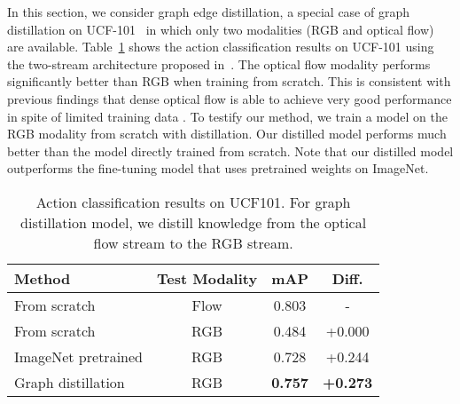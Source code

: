 In this section, we consider graph edge distillation, a special case of graph distillation on UCF-101~\cite{soomro2012ucf101} in which only two modalities (RGB and optical flow) are available. Table~\ref{ucf101} shows the action classification results on UCF-101 using the two-stream architecture proposed in~\cite{two_stream_simonyan}. The optical flow modality performs significantly better than RGB when training from scratch. This is consistent with previous findings that dense optical flow is able to achieve very good performance in spite of limited training data \cite{two_stream_simonyan}. To testify our method, we train a model on the RGB modality from scratch with distillation. Our distilled model performs much better than the model directly trained from scratch. Note that our distilled model outperforms the fine-tuning model that uses pretrained weights on ImageNet.

\begin{table}[ht]
\scriptsize
\centering
\caption{Action classification results on UCF101. For graph distillation model, we distill knowledge from the optical flow stream to the RGB stream.}
\label{ucf101}
\begin{tabular}{l@{\hskip 0.1in}c@{\hskip 0.2in}c@{\hskip 0.1in}c}
\toprule
Method & Test Modality & mAP & Diff. \\
\midrule
From scratch   & Flow & 0.803 & - \\
From scratch   & RGB & 0.484 & +0.000 \\
ImageNet pretrained & RGB & 0.728 & +0.244 \\
Graph distillation & RGB & \textbf{0.757} & \textbf{+0.273} \\
\bottomrule
\end{tabular}
\end{table}
